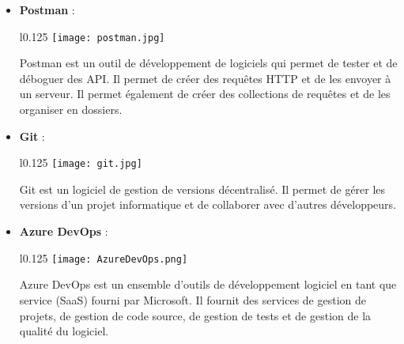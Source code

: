 \begin{itemize}
    \vspace{0.5cm}

    \item \textbf{Postman} :\\
    \begin{minipage}{\linewidth}
      \begin{wrapfigure}{l}{0.125\textwidth}
        \vspace{-0.5cm}
        \texttt{[image: postman.jpg]} 
      \end{wrapfigure}
      Postman est un outil de développement de logiciels qui permet de tester et de déboguer des API. Il permet de créer des requêtes HTTP et de les envoyer à un serveur. Il permet également de créer des collections de requêtes et de les organiser en dossiers. \cite{postman}
    \end{minipage}

    \vspace{0.5cm}
    \item \textbf{Git} :\\
    \begin{minipage}{\linewidth}
      \begin{wrapfigure}{l}{0.125\textwidth}
        \vspace{-0.5cm}
        \texttt{[image: git.jpg]} 
      \end{wrapfigure}
      Git est un logiciel de gestion de versions décentralisé. Il permet de gérer les versions d'un projet informatique et de collaborer avec d'autres développeurs. \cite{git}
    \end{minipage}
    

    \vspace{0.5cm}
    \item \textbf{Azure DevOps} :\\
    \begin{minipage}{\linewidth}
      \begin{wrapfigure}{l}{0.125\textwidth}
        \vspace{-0.5cm}
        \texttt{[image: AzureDevOps.png]} 
      \end{wrapfigure}
      Azure DevOps est un ensemble d'outils de développement logiciel en tant que service (SaaS) fourni par Microsoft. Il fournit des services de gestion de projets, de gestion de code source, de gestion de tests et de gestion de la qualité du logiciel. \cite{azureDevOps}
    \end{minipage}


\end{itemize}
